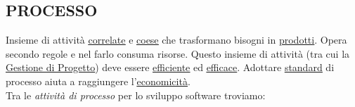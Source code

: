 		\subsection{PROCESSO}  \label{processo}
		Insieme di attività \underline{\hyperref[correlato]{correlate}} e \underline{\hyperref[coeso]{coese}} che trasformano bisogni in \underline{\hyperref[prodotto]{prodotti}}. Opera secondo regole e nel farlo consuma risorse. Questo insieme di attività (tra cui la \underline{\hyperref[gestioneprogetto]{Gestione di Progetto}}) deve essere \underline{\hyperref[efficienza]{efficiente}} ed \underline{\hyperref[efficacia]{efficace}}. Adottare \underline{\hyperref[standard]{standard}} di processo aiuta a raggiungere l'\underline{\hyperref[economicita]{economicità}}.\\
		Tra le \textit{attività di processo} per lo sviluppo software troviamo:
